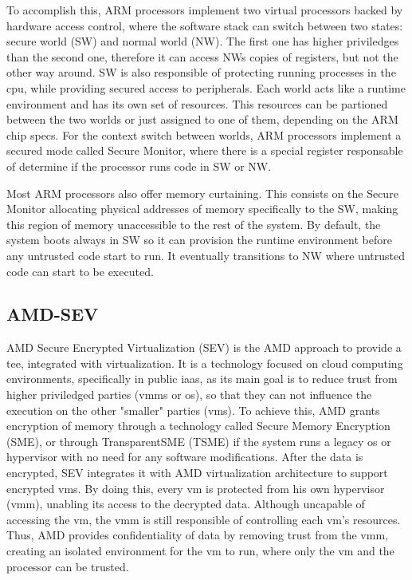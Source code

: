 To accomplish this, ARM processors implement two virtual processors backed by hardware access control, where the software stack can switch between two states: secure world (SW) and normal world (NW). 
The first one has higher priviledges than the second one, therefore it can access NWs copies of registers, but not the other way around. SW is also responsible of protecting running processes in the \gls{cpu}, while providing secured access to peripherals. 
Each world acts like a runtime environment and has its own set of resources. This resources can be partioned between the two worlds or just assigned to one of them, depending on the ARM chip specs.
For the context switch between worlds, ARM processors implement a secured mode called Secure Monitor, where there is a special register responsable of determine if the processor runs code in SW or NW. 

Most ARM processors also offer memory curtaining. This consists on the Secure Monitor allocating physical addresses of memory specifically to the SW, making this region of memory unaccessible to the rest of the system.
By default, the system boots always in SW so it can provision the runtime environment before any untrusted code start to run. It eventually transitions to NW where untrusted code can start to be executed. 

\subsection{AMD-SEV}
\label{ssec:amdsev}
AMD Secure Encrypted Virtualization (SEV) \cite{amdPaper} is the AMD approach to provide a \gls{tee}, integrated with virtualization. It is a technology focused on cloud computing environments, specifically in public \gls{iaas}, as its main goal is to reduce trust from higher priviledged parties (\gls{vmm}s or \gls{os}), so that they can not influence the execution on the other "smaller" parties (\gls{vm}s). 
To achieve this, AMD grants encryption of memory through a technology called Secure Memory Encryption (SME), or through TransparentSME (TSME) if the system runs a legacy \gls{os} or hypervisor with no need for any software modifications.
After the data is encrypted, SEV integrates it with AMD virtualization architecture to support encrypted \gls{vm}s. By doing this, every \gls{vm} is protected from his own hypervisor (\gls{vmm}), unabling its access to the decrypted data. Although uncapable of accessing the \gls{vm}, the \gls{vmm} is still responsible of controlling each \gls{vm}'s resources. 
Thus, AMD provides confidentiality of data by removing trust from the \gls{vmm}, creating an isolated environment for the \gls{vm} to run, where only the \gls{vm} and the processor can be trusted. 

